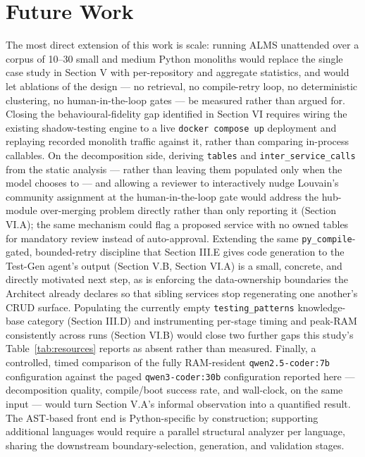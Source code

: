 \documentclass[conference]{IEEEtran}
\begin{document}
\section{Future Work}

The most direct extension of this work is scale: running ALMS unattended over a corpus of 10--30 small and medium Python monoliths would replace the single case study in Section V with per-repository and aggregate statistics, and would let ablations of the design --- no retrieval, no compile-retry loop, no deterministic clustering, no human-in-the-loop gates --- be measured rather than argued for. Closing the behavioural-fidelity gap identified in Section VI requires wiring the existing shadow-testing engine to a live \texttt{docker compose up} deployment and replaying recorded monolith traffic against it, rather than comparing in-process callables. On the decomposition side, deriving \texttt{tables} and \texttt{inter\_service\_calls} from the static analysis --- rather than leaving them populated only when the model chooses to --- and allowing a reviewer to interactively nudge Louvain's community assignment at the human-in-the-loop gate would address the hub-module over-merging problem directly rather than only reporting it (Section VI.A); the same mechanism could flag a proposed service with no owned tables for mandatory review instead of auto-approval. Extending the same \texttt{py\_compile}-gated, bounded-retry discipline that Section III.E gives code generation to the Test-Gen agent's output (Section V.B, Section VI.A) is a small, concrete, and directly motivated next step, as is enforcing the data-ownership boundaries the Architect already declares so that sibling services stop regenerating one another's CRUD surface. Populating the currently empty \texttt{testing\_patterns} knowledge-base category (Section III.D) and instrumenting per-stage timing and peak-RAM consistently across runs (Section VI.B) would close two further gaps this study's Table~\ref{tab:resources} reports as absent rather than measured. Finally, a controlled, timed comparison of the fully RAM-resident \texttt{qwen2.5-coder:7b} configuration against the paged \texttt{qwen3-coder:30b} configuration reported here --- decomposition quality, compile/boot success rate, and wall-clock, on the same input --- would turn Section V.A's informal observation into a quantified result. The AST-based front end is Python-specific by construction; supporting additional languages would require a parallel structural analyzer per language, sharing the downstream boundary-selection, generation, and validation stages.
\end{document}
